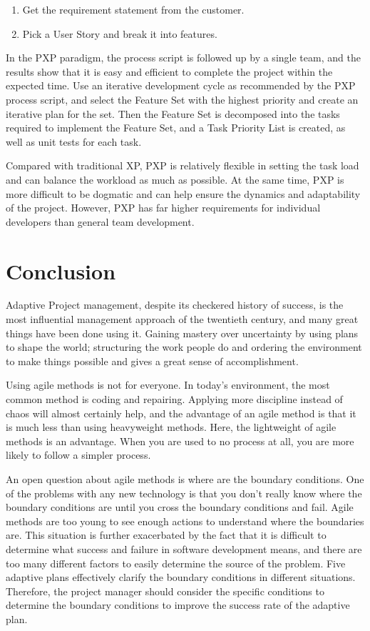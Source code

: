\documentclass{sigchi}
\begin{document}
\begin{itemize}
\begin{enumerate}
\item Get the requirement statement from the customer.
\item Pick a User Story and break it into features.
\end{enumerate}
\end{itemize}

In the PXP paradigm, the process script is followed up by a single team, and the results show that it is easy and efficient to complete the project within the expected time. Use an iterative development cycle as recommended by the PXP process script, and select the Feature Set with the highest priority and create an iterative plan for the set. Then the Feature Set is decomposed into the tasks required to implement the Feature Set, and a Task Priority List is created, as well as unit tests for each task.

Compared with traditional XP, PXP is relatively flexible in setting the task load and can balance the workload as much as possible. At the same time, PXP is more difficult to be dogmatic and can help ensure the dynamics and adaptability of the project. However, PXP has far higher requirements for individual developers than general team development.



\section{Conclusion}

Adaptive Project management, despite its checkered history of success, is the most inﬂuential management approach of the twentieth century, and many great things have been done using it. Gaining mastery over uncertainty by using plans to shape the world; structuring the work people do and ordering the environment to make things possible and gives a great sense of accomplishment.

Using agile methods is not for everyone. In today's environment, the most common method is coding and repairing. Applying more discipline instead of chaos will almost certainly help, and the advantage of an agile method is that it is much less than using heavyweight methods. Here, the lightweight of agile methods is an advantage. When you are used to no process at all, you are more likely to follow a simpler process.

An open question about agile methods is where are the boundary conditions. One of the problems with any new technology is that you don't really know where the boundary conditions are until you cross the boundary conditions and fail. Agile methods are too young to see enough actions to understand where the boundaries are. This situation is further exacerbated by the fact that it is difficult to determine what success and failure in software development means, and there are too many different factors to easily determine the source of the problem. Five adaptive plans effectively clarify the boundary conditions in different situations. Therefore, the project manager should consider the specific conditions to determine the boundary conditions to improve the success rate of the adaptive plan. 
\end{document}
